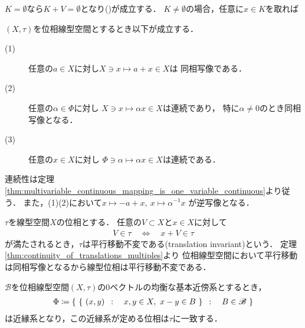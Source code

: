 	\begin{prf}
		$K = \emptyset$なら$K + V = \emptyset$となり()が成立する．
		$K \neq \emptyset$の場合，任意に$x \in K$を取れば
	\end{prf}
	
	\begin{screen}
		\begin{thm}\label{thm:continuity_of_translations_multiples}
			$(X,\tau)$を位相線型空間とするとき以下が成立する．
			\begin{description}
				\item[(1)] 任意の$a \in X$に対し$X \ni x \longmapsto a + x \in X$は
					同相写像である．
					
				\item[(2)] 任意の$\alpha \in \Phi$に対し
					$X \ni x \longmapsto \alpha x \in X$は連続であり，
					特に$\alpha \neq 0$のとき同相写像となる．
					
				\item[(3)] 任意の$x \in X$に対し
					$\Phi \ni \alpha \longmapsto \alpha x \in X$は連続である．
			\end{description}
		\end{thm}
	\end{screen}
	
	\begin{prf}
		連続性は定理\ref{thm:multivariable_continuous_mapping_is_one_variable_continuous}より従う．
		また，(1)(2)において$x \longmapsto -a+x,\ x \longmapsto \alpha^{-1}x$
		が逆写像となる．
		\QED
	\end{prf}
	
	\begin{screen}
		\begin{thm}[平行移動不変位相]
			$\tau$を線型空間$X$の位相とする．
			任意の$V \subset X$と$x \in X$に対して
			\begin{align}
				V \in \tau \quad \Longleftrightarrow \quad
				x + V \in \tau
			\end{align}
			が満たされるとき，$\tau$は平行移動不変である(translation invariant)という．
			定理\ref{thm:continuity_of_translations_multiples}より
			位相線型空間において平行移動は同相写像となるから線型位相は平行移動不変である．
		\end{thm}
	\end{screen}
	
	\begin{screen}
		\begin{thm}[位相線型空間は一様空間]
			$\mathscr{B}$を位相線型空間$(X,\tau)$の0ベクトルの均衡な基本近傍系とするとき，
			\begin{align}
				\Phi \coloneqq
				\left\{\ \left\{\ (x,y)\ \, : \quad x,y \in X,\ x-y \in B\ \right\}\ \, : \quad B \in \mathscr{B}\ \right\}
			\end{align}
			は近縁系となり，この近縁系が定める位相は$\tau$に一致する．
		\end{thm}
	\end{screen}
	
